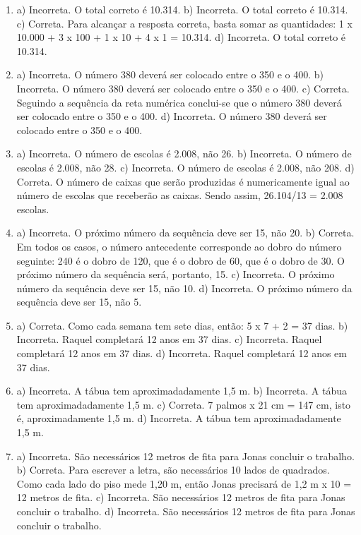 \begin{enumerate}
\item
a) Incorreta. O total correto é 10.314.
b) Incorreta. O total correto é 10.314.
c) Correta. Para alcançar a resposta correta, basta somar as quantidades: 
1 x 10.000 + 3 x 100 + 1 x 10 + 4 x 1 = 10.314.
d)  Incorreta. O total correto é 10.314.

\item
a) Incorreta. O número 380 deverá ser colocado entre o 350 e o 400.
b) Incorreta. O número 380 deverá ser colocado entre o 350 e o 400.
c) Correta. Seguindo a sequência da reta numérica conclui-se que o 
número 380 deverá ser colocado entre o 350 e o 400.
d) Incorreta. O número 380 deverá ser colocado entre o 350 e o 400.

\item
a) Incorreta. O número de escolas é 2.008, não 26.
b) Incorreta. O número de escolas é 2.008, não 28.
c) Incorreta.  O número de escolas é 2.008, não 208.
d) Correta. O número de caixas que serão produzidas é numericamente igual
ao número de escolas que receberão as caixas. Sendo assim, 26.104/13 = 
2.008 escolas.

\item
a) Incorreta. O próximo número da sequência deve ser 15, não 20.
b) Correta. Em todos os casos, o número antecedente corresponde ao 
dobro do número seguinte: 240 é o dobro de 120, que é o dobro de 60, 
que é o dobro de 30. O próximo número da sequência será, portanto, 15.
c) Incorreta. O próximo número da sequência deve ser 15, não 10.
d) Incorreta. O próximo número da sequência deve ser 15, não 5.

\item
a) Correta. Como cada semana tem sete dias, então: 5 x 7 + 2 = 37 dias.
b) Incorreta. Raquel completará 12 anos em 37 dias.
c) Incorreta. Raquel completará 12 anos em 37 dias.
d) Incorreta. Raquel completará 12 anos em 37 dias.

\item
a) Incorreta. A tábua tem aproximadadamente 1,5 m.
b) Incorreta. A tábua tem aproximadadamente 1,5 m.
c) Correta. 7 palmos x 21 cm = 147 cm, isto é, aproximadamente 1,5 m.
d) Incorreta. A tábua tem aproximadadamente 1,5 m.

\item
a) Incorreta. São necessários 12 metros de fita para Jonas concluir 
o trabalho.
b) Correta. Para escrever a letra, são necessários 10 lados de quadrados.
Como cada lado do piso mede 1,20 m, então Jonas precisará de 
1,2 m x 10 = 12 metros de fita.
c) Incorreta. São necessários 12 metros de fita para Jonas concluir 
o trabalho.
d) Incorreta. São necessários 12 metros de fita para Jonas concluir 
o trabalho.


\end{enumerate}
